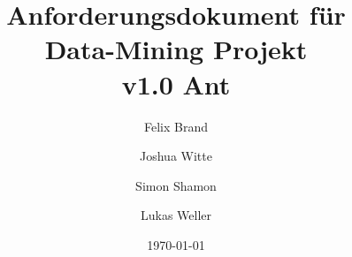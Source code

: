 \documentclass{book}
\title{Anforderungsdokument für \\
Data-Mining Projekt\\v1.0 Ant}
\author{Felix Brand \and Joshua Witte \and Simon Shamon \and Lukas Weller}
\date{\today}
\begin{document}

\maketitle


\printglossaries

\tableofcontents




\end{document}
